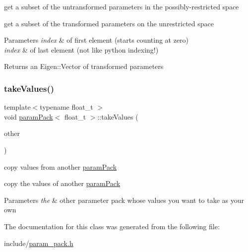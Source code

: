 get a subset of the untransformed parameters in the possibly-\/restricted space 

get a subset of the transformed parameters on the unrestricted space 
\begin{DoxyParams}{Parameters}
{\em index} & of first element (starts counting at zero) \\
\hline
{\em index} & of last element (not like python indexing!) \\
\hline
\end{DoxyParams}
\begin{DoxyReturn}{Returns}
an Eigen\+::\+Vector of transformed parameters 
\end{DoxyReturn}
\mbox{\label{classparamPack_aa0826edf3da82e1b8ffe133f14e6f119}} 
\subsubsection{\texorpdfstring{take\+Values()}{takeValues()}}
{\footnotesize\ttfamily template$<$typename float\+\_\+t $>$ \\
void \hyperlink{classparamPack}{param\+Pack}$<$ float\+\_\+t $>$\+::take\+Values (\begin{DoxyParamCaption}\item[{const \hyperlink{classparamPack}{param\+Pack}$<$ float\+\_\+t $>$ \&}]{other }\end{DoxyParamCaption})}



copy values from another \hyperlink{classparamPack}{param\+Pack} 

copy the values of another \hyperlink{classparamPack}{param\+Pack} 
\begin{DoxyParams}{Parameters}
{\em the} & other parameter pack whose values you want to take as your own \\
\hline
\end{DoxyParams}


The documentation for this class was generated from the following file\+:\begin{DoxyCompactItemize}
\item 
include/\hyperlink{param__pack_8h}{param\+\_\+pack.\+h}\end{DoxyCompactItemize}
